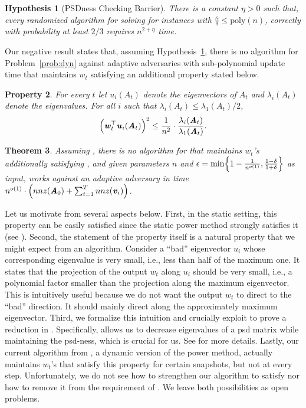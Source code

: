 \documentclass[11pt]{article}
\newtheorem{theorem}{Theorem}[section]
\newtheorem{property}[theorem]{Property}
\newtheorem{hypothesis}[theorem]{Hypothesis}
\newcommand\poly{\mathrm{poly}}  \newcommand{\comp}[1]{\overline{#1}}
\let\originalleft\left
\let\originalright\right
\renewcommand{\left}{\mathopen{}\mathclose\bgroup\originalleft}
\renewcommand{\right}{\aftergroup\egroup\originalright}
\newcommand\uu{\boldsymbol{\mathit{u}}}
\newcommand\vv{\boldsymbol{\mathit{v}}}
\newcommand\ww{\boldsymbol{\mathit{w}}}
\renewcommand\AA{\boldsymbol{\mathit{A}}}
\begin{document}
\begin{hypothesis}
	[PSDness Checking Barrier]\label{conj:decomp is hard}There is a constant $\eta>0$ such that, every randomized algorithm for solving  for instances with $\frac{\kappa}{\delta}\leq \poly(n)$, correctly with probability at least $2/3$ requires $n^{2+\eta}$ time. 
\end{hypothesis}


Our negative result states that, assuming  Hypothesis~\ref{conj:decomp is hard}, there is no  algorithm for Problem~\ref{prob:dyn} against adaptive adversaries with sub-polynomial update time
that maintains $\ww_t$ satisfying an additional property stated below.

\begin{property}\label{def:super}\label{prop:assume} For every $t$ let $\uu_i(\AA_t)$ denote the eigenvectors of $\AA_t$ and $\lambda_i(\AA_t)$ denote the eigenvalues. For all $i$ such that $\lambda_i(\AA_t)\leq \lambda_1(\AA_t)/2$,
\[
\left(\ww_t^{\top}\uu_i\left(\AA_{t}\right)\right)^2 \leq \frac{1}{n^2}\cdot \frac{\lambda_i\left(\AA_{t}\right)}{\lambda_1(\AA_t)}.
\]
\end{property}

\begin{theorem}
	\label{thm:lower}Assuming , there is no algorithm for  that maintains $\ww_t$'s additionally satisfying , and given parameters $n$ and $\epsilon=\min\left\{1-\frac{1}{n^{o(1)}},\frac{1-\delta}{1+\delta}\right\}$ as input, works against an adaptive adversary in time $n^{o(1)}\cdot \left(nnz(\AA_0) + \sum_{t=1}^T nnz(\vv_i)\right)$. 
\end{theorem}

Let us motivate  from several aspects below. First, in the static setting, this property can be easily satisfied since the static power method strongly satisfies it (see ). 
Second, the statement of the property itself is a natural property that we might expect from an algorithm. Consider a ``bad'' eigenvector $\uu_i$ whose corresponding eigenvalue is very small, i.e., less than half of the maximum one.
It states that the projection of the output $\ww_t$ along $\uu_i$ should be very small, i.e., a polynomial factor smaller than the projection along the maximum eigenvector. This is intuitively useful because we do not want the output $\ww_t$ to direct to the ``bad'' direction. It should mainly direct along the approximately maximum eigenvector.
Third, we formalize this intuition and crucially exploit  to prove a reduction in . 
Specifically,  allows us to decrease eigenvalues of a psd matrix while maintaining the psd-ness, which is crucial for us. See  for more details. 
Lastly, our current algorithm from , a dynamic version of the power method, actually maintains $\ww_t$'s that satisfy this property for certain snapshots, but not at every step. Unfortunately, we do not see how to strengthen our algorithm to satisfy  nor how to remove it from the requirement of . We leave both possibilities as open problems.
\end{document}
